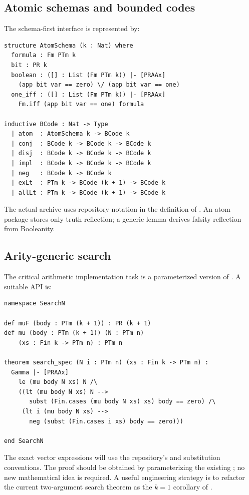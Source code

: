 \subsection{Atomic schemas and bounded codes}

The schema-first interface is represented by:

\begin{lstlisting}
structure AtomSchema (k : Nat) where
  formula : Fm PTm k
  bit : PR k
  boolean : ([] : List (Fm PTm k)) |- [PRAAx]
    (app bit var == zero) \/ (app bit var == one)
  one_iff : ([] : List (Fm PTm k)) |- [PRAAx]
    Fm.iff (app bit var == one) formula

inductive BCode : Nat -> Type
  | atom  : AtomSchema k -> BCode k
  | conj  : BCode k -> BCode k -> BCode k
  | disj  : BCode k -> BCode k -> BCode k
  | impl  : BCode k -> BCode k -> BCode k
  | neg   : BCode k -> BCode k
  | exLt  : PTm k -> BCode (k + 1) -> BCode k
  | allLt : PTm k -> BCode (k + 1) -> BCode k
\end{lstlisting}

The actual archive uses repository notation in the definition of
.  An atom package stores only truth reflection; a generic
lemma derives falsity reflection from Booleanity.

\subsection{Arity-generic search}

The critical arithmetic implementation task is a parameterized version of
.  A suitable API is:

\begin{lstlisting}
namespace SearchN

def muF (body : PTm (k + 1)) : PR (k + 1)
def mu (body : PTm (k + 1)) (N : PTm n)
    (xs : Fin k -> PTm n) : PTm n

theorem search_spec (N i : PTm n) (xs : Fin k -> PTm n) :
  Gamma |- [PRAAx]
    le (mu body N xs) N /\
    ((lt (mu body N xs) N -->
       subst (Fin.cases (mu body N xs) xs) body == zero) /\
     (lt i (mu body N xs) -->
       neg (subst (Fin.cases i xs) body == zero)))

end SearchN
\end{lstlisting}

The exact vector expressions will use the repository's  and
substitution conventions.  The proof should be obtained by parameterizing the
existing \code{spec\_open}; no new mathematical idea is required.  A useful
engineering strategy is to refactor the current two-argument search theorem as
the \(k=1\) corollary of \code{SearchN}.

